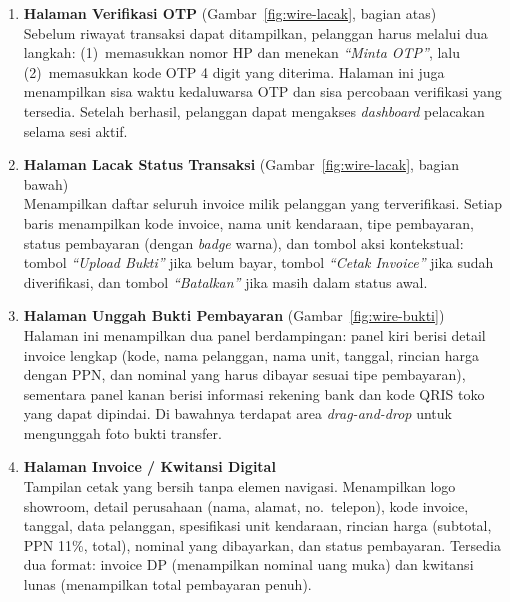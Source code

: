 \documentclass[11pt, a5paper]{article}
\begin{document}
\begin{enumerate}[label=\arabic*.]
  \item \textbf{Halaman Verifikasi OTP}
        (Gambar~\ref{fig:wire-lacak}, bagian atas)\\
        Sebelum riwayat transaksi dapat ditampilkan, pelanggan harus melalui
        dua langkah: (1)~memasukkan nomor HP dan menekan \textit{``Minta OTP''},
        lalu (2)~memasukkan kode OTP 4 digit yang diterima. Halaman ini juga
        menampilkan sisa waktu kedaluwarsa OTP dan sisa percobaan verifikasi
        yang tersedia. Setelah berhasil, pelanggan dapat mengakses
        \textit{dashboard} pelacakan selama sesi aktif.

  \item \textbf{Halaman Lacak Status Transaksi}
        (Gambar~\ref{fig:wire-lacak}, bagian bawah)\\
        Menampilkan daftar seluruh invoice milik pelanggan yang terverifikasi.
        Setiap baris menampilkan kode invoice, nama unit kendaraan, tipe
        pembayaran, status pembayaran (dengan \textit{badge} warna), dan
        tombol aksi kontekstual: tombol \textit{``Upload Bukti''} jika belum
        bayar, tombol \textit{``Cetak Invoice''} jika sudah diverifikasi,
        dan tombol \textit{``Batalkan''} jika masih dalam status awal.

  \item \textbf{Halaman Unggah Bukti Pembayaran}
        (Gambar~\ref{fig:wire-bukti})\\
        Halaman ini menampilkan dua panel berdampingan: panel kiri berisi
        detail invoice lengkap (kode, nama pelanggan, nama unit, tanggal,
        rincian harga dengan PPN, dan nominal yang harus dibayar sesuai tipe
        pembayaran), sementara panel kanan berisi informasi rekening bank dan
        kode QRIS toko yang dapat dipindai. Di bawahnya terdapat area
        \textit{drag-and-drop} untuk mengunggah foto bukti transfer.

  \item \textbf{Halaman Invoice / Kwitansi Digital}\\
        Tampilan cetak yang bersih tanpa elemen navigasi. Menampilkan logo
        showroom, detail perusahaan (nama, alamat, no.\ telepon), kode invoice,
        tanggal, data pelanggan, spesifikasi unit kendaraan, rincian harga
        (subtotal, PPN 11\%, total), nominal yang dibayarkan, dan status
        pembayaran. Tersedia dua format: invoice DP (menampilkan nominal uang
        muka) dan kwitansi lunas (menampilkan total pembayaran penuh).
\end{enumerate}
\end{document}
